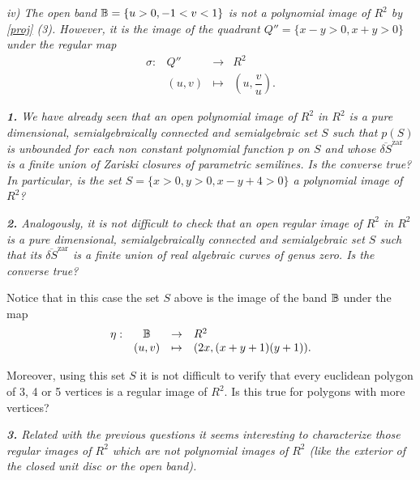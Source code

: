 \documentclass[11pt,draft]{article}
\newcommand{\add}{\noindent\addtocounter{thm}{1}}
\newcommand{\Zar}{\operatorname{zar}}
\newcommand{\ol}{\overline}
\begin{document}
\em iv) \em The open band ${\mathbb B}=\{u>0,-1<v<1\}$ is not a polynomial image of $R^2$ by
\ref{proj} (3). However, it is the image of the quadrant $Q''=\{x-y>0,x+y>0\}$  under the
regular map
$$
\begin{array}{rccl}
\sigma:&Q''&\rightarrow &R^2\\
 & (u,v)&\mapsto& (u,\dfrac{v}{u}).
\end{array}
$$

\add{}

\em {\bf 1.} \em We have already seen that an open polynomial image of $R^2$ in $R^2$ is a
pure dimensional, semialgebraically connected and semialgebraic set $S$ such that $p(S)$ is
unbounded for each non constant polynomial function $p$ on $S$ and whose $\ol{\delta
S}^{\Zar}$ is a finite union of Zariski closures of parametric semilines. Is the converse
true? In particular, is the set $S=\{x>0,y>0,x-y+4>0\}$ a polynomial image of $R^2$?

\em {\bf 2.} \em Analogously, it is not difficult to check that an open regular image of
$R^2$ in $R^2$ is a pure dimensional, semialgebraically connected and semialgebraic set $S$
such that its $\ol{\delta S}^{\Zar}$ is a finite union of real algebraic curves of genus
zero. Is the converse true?

Notice that in this case the set $S$ above is the image of the band ${\mathbb B}$ under the map
$$
\begin{array}{rccl}
\eta:&{\mathbb B}&\rightarrow &R^2\\
 & (u,v)&\mapsto& (2x,(x+y+1)(y+1)).
\end{array}
$$

Moreover, using this set $S$ it is not difficult to verify that every euclidean polygon of
3, 4 or 5 vertices is a regular image of $R^2$. Is this true for polygons with more
vertices?

\em {\bf 3.} \em Related with the previous questions it seems interesting to characterize
those regular images of $R^2$ which are not polynomial images of $R^2$ (like the exterior
of the closed unit disc or the open band).
\end{document}

